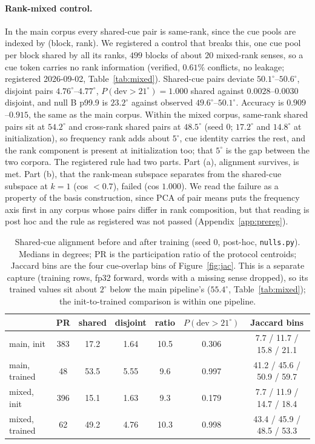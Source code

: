 \documentclass{article}
\newcommand{\degr}{^{\circ}}
\begin{document}
\paragraph{Rank-mixed control.} In the main corpus every shared-cue pair is
same-rank, since the cue pools are indexed by (block, rank). We registered a
control that breaks this, one cue pool per block shared by all its ranks, $499$
blocks of about $20$ mixed-rank senses, so a cue token carries no rank information
(verified, $0.61\%$ conflicts, no leakage; registered 2026-09-02,
Table~\ref{tab:mixed}). Shared-cue pairs deviate $50.1\degr$--$50.6\degr$,
disjoint pairs $4.76\degr$--$4.77\degr$, $P(\text{dev}>21\degr)=1.000$ shared
against $0.0028$--$0.0030$ disjoint, and null B p99.9 is $23.2\degr$ against
observed $49.6\degr$--$50.1\degr$. Accuracy is $0.909$--$0.915$, the same as the
main corpus. Within the mixed corpus, same-rank shared pairs sit at $54.2\degr$
and cross-rank shared pairs at $48.5\degr$ (seed 0; $17.2\degr$ and $14.8\degr$
at initialization), so frequency rank adds about $5\degr$, cue identity carries
the rest, and the rank component is present at initialization too; that $5\degr$
is the gap between the two corpora. The
registered rule had two parts. Part (a), alignment survives, is met. Part (b),
that the rank-mean subspace separates from the shared-cue subspace at $k{=}1$
(cos $<0.7$), failed (cos $1.000$). We read the failure as a property of the basis
construction, since PCA of pair means puts the frequency axis first in any corpus
whose pairs differ in rank composition, but that reading is post hoc and the rule
as registered was not passed (Appendix~\ref{app:prereg}).

\begin{table}[t]
  \centering\footnotesize
  \caption{Shared-cue alignment before and after training (seed 0, post-hoc,
    \texttt{nulls.py}). Medians in degrees; PR is the participation ratio of the
    protocol centroids; Jaccard bins are the four cue-overlap bins of
    Figure~\ref{fig:jac}. This is a separate capture (training rows, fp32 forward,
    words with a missing sense dropped), so its trained values sit about $2\degr$
    below the main pipeline's ($55.4\degr$, Table~\ref{tab:mixed}); the
    init-to-trained comparison is within one pipeline.}
  \label{tab:init}
  \renewcommand{\arraystretch}{1.1}
  \setlength{\tabcolsep}{3pt}
  \begin{tabular}{@{}lcccccc@{}}
    \toprule
    & PR & shared & disjoint & ratio & $P(\text{dev}{>}21\degr)$ & Jaccard bins \\
    \midrule
    main, init & 383 & 17.2 & 1.64 & 10.5 & 0.306 & 7.7 / 11.7 / 15.8 / 21.1 \\
    main, trained & 48 & 53.5 & 5.55 & 9.6 & 0.997 & 41.2 / 45.6 / 50.9 / 59.7 \\
    mixed, init & 396 & 15.1 & 1.63 & 9.3 & 0.179 & 7.7 / 11.9 / 14.7 / 18.4 \\
    mixed, trained & 62 & 49.2 & 4.76 & 10.3 & 0.998 & 43.4 / 45.9 / 48.5 / 53.3 \\
    \bottomrule
  \end{tabular}
\end{table}
\end{document}

